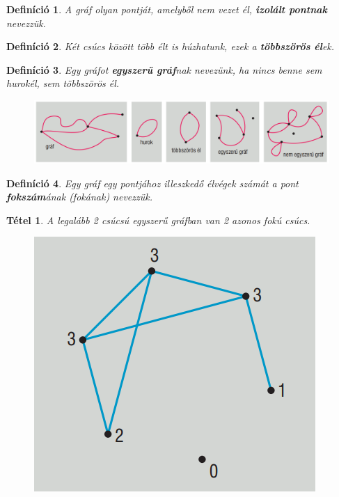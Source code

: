 \documentclass[12pt,a4paper]{article}
\newtheorem{theorem}{Tétel} [section]
\newtheorem{definition}{Definíció} [section]
\begin{document}
\begin{definition}
A gráf olyan pontját, amelyből nem vezet él, \textbf{izolált pontnak} nevezzük.
\end{definition}

\begin{definition}
Két csúcs között több élt is húzhatunk, ezek a \textbf{többszörös él}ek.
\end{definition}

\begin{definition}
Egy gráfot \textbf{egyszerű gráf}nak nevezünk, ha nincs benne sem hurokél, sem többszörös él.
\end{definition}

\begin{figure}[h]
\centering
\includegraphics[scale=0.3]{geometry/grafok}
\end{figure}

\begin{definition}
Egy gráf egy pontjához illeszkedő élvégek számát a pont \textbf{fokszám}ának (fokának) nevezzük.
\end{definition}
\newpage
\begin{theorem}
A legalább 2 csúcsú egyszerű gráfban van 2 azonos fokú csúcs.
\begin{figure}[h]
\centering
\includegraphics[scale=0.3]{geometry/graf}
\end{figure}
\end{theorem}
\end{document}
